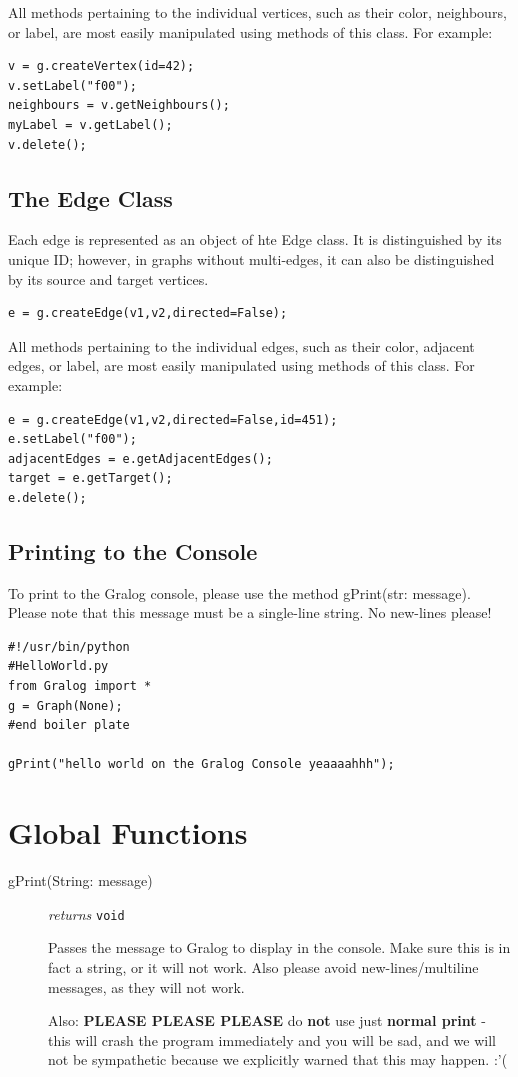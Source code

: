 \documentclass{article}
\newcounter{example}
\newlength\q
\begin{document}
All methods pertaining to the individual vertices, such as their color, neighbours, or label, are most easily manipulated using methods of this class. For example:

\begin{lstlisting}
v = g.createVertex(id=42);
v.setLabel("f00");
neighbours = v.getNeighbours();
myLabel = v.getLabel();
v.delete();
\end{lstlisting}

\subsection{The Edge Class}
Each edge is represented as an object of hte Edge class. It is distinguished by its unique ID; however, in graphs without multi-edges, it can also be distinguished by its source and target vertices.

\begin{lstlisting}
e = g.createEdge(v1,v2,directed=False);
\end{lstlisting}

All methods pertaining to the individual edges, such as their color, adjacent edges, or label, are most easily manipulated using methods of this class. For example:

\begin{lstlisting}
e = g.createEdge(v1,v2,directed=False,id=451);
e.setLabel("f00");
adjacentEdges = e.getAdjacentEdges();
target = e.getTarget();
e.delete();
\end{lstlisting}

\subsection{Printing to the Console}
To print to the Gralog console, please use the method gPrint(str: message). Please note that this message must be a single-line string. No new-lines please!

\begin{lstlisting}
#!/usr/bin/python
#HelloWorld.py
from Gralog import *
g = Graph(None);
#end boiler plate

gPrint("hello world on the Gralog Console yeaaaahhh");
\end{lstlisting}

\section{Global Functions}
\begin{description}


\item[gPrint(String: message)] \emph{returns} \texttt{void}

Passes the message to Gralog to display in the console. Make sure this is in fact a string, or it will not work. Also please avoid new-lines/multiline messages, as they will not work.

Also: \textbf{PLEASE PLEASE PLEASE} do \textbf{not} use just \textbf{normal print} - this will crash the program immediately and you will be sad, and we will not be sympathetic because we explicitly warned that this may happen. :'(
\end{description}
\end{document}
